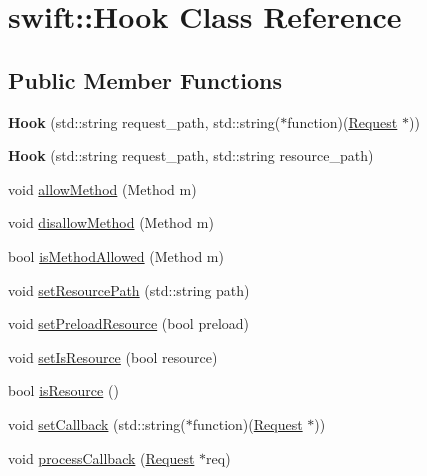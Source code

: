 \hypertarget{classswift_1_1_hook}{\section{swift\-:\-:Hook Class Reference}
\label{classswift_1_1_hook}
}
\subsection*{Public Member Functions}
\begin{DoxyCompactItemize}
\item 
\hypertarget{classswift_1_1_hook_ad0ac63716f7f8dd6f6daf34480adb222}{{\bfseries Hook} (std\-::string request\-\_\-path, std\-::string($\ast$function)(\hyperlink{classswift_1_1_request}{Request} $\ast$))}\label{classswift_1_1_hook_ad0ac63716f7f8dd6f6daf34480adb222}

\item 
\hypertarget{classswift_1_1_hook_a08e8c205418d4dc95a24ad10f0a6754e}{{\bfseries Hook} (std\-::string request\-\_\-path, std\-::string resource\-\_\-path)}\label{classswift_1_1_hook_a08e8c205418d4dc95a24ad10f0a6754e}

\item 
void \hyperlink{classswift_1_1_hook_ab8f2a030f4234be5aaea657628414669}{allow\-Method} (Method m)
\item 
void \hyperlink{classswift_1_1_hook_a02148f71598a14eb8c7f42d9c82f50cb}{disallow\-Method} (Method m)
\item 
bool \hyperlink{classswift_1_1_hook_ad5e71e832b6290d4f195a5dcd594e661}{is\-Method\-Allowed} (Method m)
\item 
void \hyperlink{classswift_1_1_hook_a4147575b0d54691515271508baa428c8}{set\-Resource\-Path} (std\-::string path)
\item 
void \hyperlink{classswift_1_1_hook_a8fc8a844df53bc651a46f9616ee635f9}{set\-Preload\-Resource} (bool preload)
\item 
void \hyperlink{classswift_1_1_hook_aeefe2c2e5080787975097a7c1b431161}{set\-Is\-Resource} (bool resource)
\item 
bool \hyperlink{classswift_1_1_hook_addbf2c39d6628c838b6fb46c96469e31}{is\-Resource} ()
\item 
void \hyperlink{classswift_1_1_hook_a592640d6908ac0a34a40ce70a1922d14}{set\-Callback} (std\-::string($\ast$function)(\hyperlink{classswift_1_1_request}{Request} $\ast$))
\item 
void \hyperlink{classswift_1_1_hook_a2e206f183d02539d7ca2f2a1ea7e2518}{process\-Callback} (\hyperlink{classswift_1_1_request}{Request} $\ast$req)
\end{DoxyCompactItemize}


